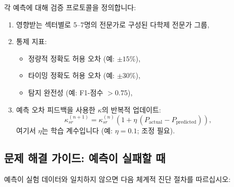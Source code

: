 \documentclass[13pt,a4paper]{article}
\begin{document}
	각 예측에 대해 검증 프로토콜을 정의합니다:
	\begin{enumerate}[leftmargin=*]
		\item 영향받는 섹터별로 5--7명의 전문가로 구성된 다학제 전문가 그룹,
		\item 통제 지표:
		\begin{itemize}[leftmargin=*]
			\item 정량적 정확도 허용 오차 (예: $\pm 15\%$),
			\item 타이밍 정확도 허용 오차 (예: $\pm 30\%$),
			\item 탐지 완전성 (예: F1-점수 $>0.75$),
		\end{itemize}
		\item 예측 오차 피드백을 사용한 $\kappa$의 반복적 업데이트:
		\[
		\kappa_{sr}^{(n+1)}=\kappa_{sr}^{(n)}\left(1+\eta\,(P_{\mathrm{actual}}-P_{\mathrm{predicted}})\right),
		\]
		여기서 $\eta$는 학습 계수입니다 (예: $\eta=0.1$; 조정 필요).
	\end{enumerate}
	
	\subsection*{문제 해결 가이드: 예측이 실패할 때}
	
	예측이 실험 데이터와 일치하지 않으면 다음 체계적 진단 절차를 따르십시오:
	
\end{document}
